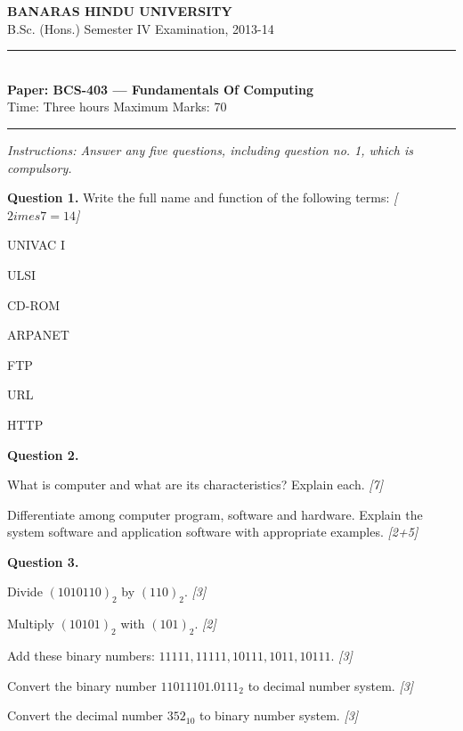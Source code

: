 \documentclass[11pt,a4paper]{article}
\newcommand{\pts}[1]{\hfill   \textit{[#1]}}
\begin{document}
\begin{center}
  {\large\bfseries BANARAS HINDU UNIVERSITY}\\[2pt]
  {\normalsize B.Sc. (Hons.) Semester IV Examination, 2013-14}\\[6pt]
  \rule{0.8\linewidth}{0.5pt}\\[6pt]
  {\large\bfseries Paper: BCS-403 --- Fundamentals Of Computing}\\[4pt]
  {\normalsize Time: Three hours \hfill Maximum Marks: 70}
\end{center}

\rule{\linewidth}{0.4pt}

\smallskip



\noindent   \textit{Instructions: Answer any five questions, including question no. 1, which is compulsory.}

\bigskip

\medskip


\noindent   \textbf{Question 1.} Write the full name and function of the following terms: \pts{$2 imes7=14$}

\begin{parts}
  \item UNIVAC I
  \item ULSI
  \item CD-ROM
  \item ARPANET
  \item FTP
  \item URL
  \item HTTP
\end{parts}

\medskip


\noindent   \textbf{Question 2.}

\begin{parts}
  \item What is computer and what are its characteristics? Explain each. \pts{7}
  \item Differentiate among computer program, software and hardware. Explain the system software and application software with appropriate examples. \pts{2+5}
\end{parts}

\medskip


\noindent   \textbf{Question 3.}

\begin{parts}
  \item Divide $(1010110)_2$ by $(110)_2$. \pts{3}
  \item Multiply $(10101)_2$ with $(101)_2$. \pts{2}
  \item Add these binary numbers: $11111, 11111, 10111, 1011, 10111$. \pts{3}
  \item Convert the binary number $11011101.0111_2$ to decimal number system. \pts{3}
  \item Convert the decimal number $352_{10}$ to binary number system. \pts{3}
\end{parts}
\end{document}
